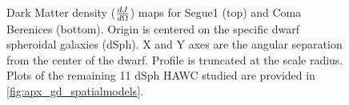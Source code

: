 \begin{figure}
    \caption{Dark Matter density ($\frac{dJ}{d\Omega}$) maps for Segue1 (top) and Coma Berenices (bottom). Origin is centered on the specific dwarf spheroidal galaxies (dSph). X and Y axes are the angular separation from the center of the dwarf. Profile is truncated at the scale radius. Plots of the remaining 11 dSph HAWC studied are provided in \cref{fig:apx_gd_spatialmodels}.}\label{fig:gd_spatialmodel}
\end{figure}


